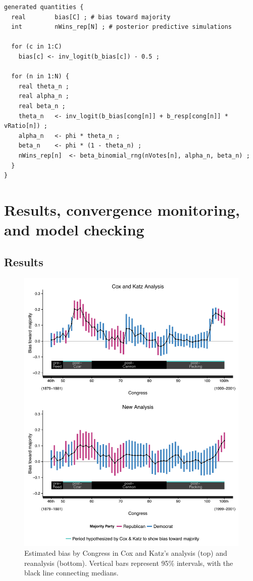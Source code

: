 \begin{singlespacing}
\small
\begin{verbatim}
generated quantities {
  real        bias[C] ; # bias toward majority
  int         nWins_rep[N] ; # posterior predictive simulations

  for (c in 1:C)
    bias[c] <- inv_logit(b_bias[c]) - 0.5 ;

  for (n in 1:N) {
    real theta_n ; 
    real alpha_n ;
    real beta_n ;
    theta_n   <- inv_logit(b_bias[cong[n]] + b_resp[cong[n]] * vRatio[n]) ;
    alpha_n   <- phi * theta_n ;
    beta_n    <- phi * (1 - theta_n) ;
    nWins_rep[n]  <- beta_binomial_rng(nVotes[n], alpha_n, beta_n) ;
  }
}
\end{verbatim}
\end{singlespacing}


\section{Results, convergence monitoring, and model checking}


\subsection{Results}
\label{subsection_results}

\begin{figure}
\centering
\includegraphics[scale=0.75]{sections/figs/ck_replication}
\caption{Estimated bias by Congress in Cox and Katz's analysis (top) and reanalysis (bottom). Vertical bars represent 95\%  intervals, with the black line connecting medians.}
\label{fig:ck_bias}
\end{figure}

